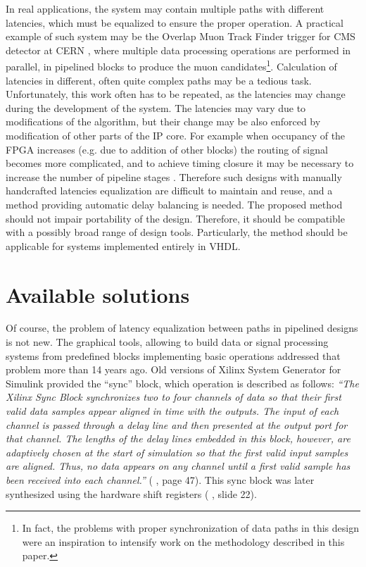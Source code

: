 \documentclass[preprint,11pt]{elsarticle}
\newcommand{\wzcite}[1]{ \cite{#1}}
\begin{document}
  In real applications, the system may contain multiple paths with different latencies,
  which must be equalized to ensure the proper operation.
  A practical example of such system may be the Overlap Muon Track Finder trigger
  for CMS detector at CERN\wzcite{doi:10.1117/12.2073380, omtf-poster}, where
  multiple data processing operations are performed in parallel, in pipelined blocks
  to produce the muon candidates\footnote{In fact, the problems with proper synchronization
  of data paths in this design were an inspiration to intensify work on the methodology
  described in this paper.}.
  Calculation of latencies in different, often quite complex paths may be a tedious task.
  Unfortunately, this work often has to be repeated, as the latencies may change during 
  the development of the system. 
  The latencies may vary due to modifications of the algorithm, but their change may be
  also enforced by modification of other parts of the IP core.
  For example when occupancy of the FPGA increases (e.g. due to addition of other blocks)
  the routing of signal becomes more complicated, and to achieve timing closure it may 
  be necessary to increase the number of pipeline 
  stages\wzcite{xlx-ufast-des-met-guide,xlx-timing-closure-user-guide, alt-timing-closure-met}.
  Therefore such designs with manually handcrafted latencies equalization are difficult 
  to maintain and reuse, and a method providing automatic delay
  balancing is needed.
  The proposed method should not impair portability of the design. Therefore, 
  it should be compatible with a possibly broad range of design tools.
  Particularly, the method should be applicable for systems implemented entirely
  in VHDL.
 \section{Available solutions}
 Of course, the problem of latency equalization between paths in
 pipelined designs is not new.
 The graphical tools, allowing to build data or signal processing systems from 
 predefined blocks implementing basic operations addressed that problem more than 14 years ago.
 Old versions of Xilinx System Generator for Simulink provided
 the ``sync'' block, which operation is described as follows:
 {\em ``The Xilinx Sync Block synchronizes two to four channels of data so that
their first valid data samples appear aligned in time with the outputs.
The input of each channel is passed through a delay line and then
presented at the output port for that channel. The lengths of the delay
lines embedded in this block, however, are adaptively chosen at the
start of simulation so that the first valid input samples are aligned.
Thus, no data appears on any channel until a first valid sample has been received into
each channel.''} (\wzcite{xlx-xsg-2.1}, page 47)\label{sec:xlx-xsg-2.1}. 
 This sync block was later synthesized using the hardware shift registers
(\wzcite{xlx-acc-dsp-designs-using-fpgas}, slide 22).
\end{document}
